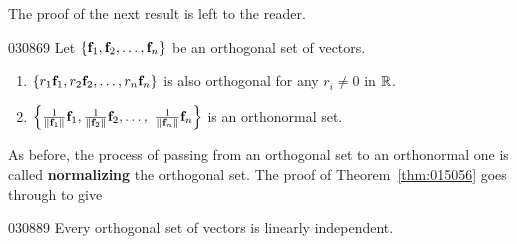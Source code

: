 The proof of the next result is left to the reader.

\begin{theorem}{}{030869}
Let $\{\textbf{f}_{1}, \textbf{f}_{2}, \dots, \textbf{f}_{n}\}$ be an orthogonal set of vectors.

\begin{enumerate}
\item $\{r_{1}\textbf{f}_{1}, r_{2}\textbf{f}_{2}, \dots, r_{n}\textbf{f}_{n}\}$ is also orthogonal for any $r_{i} \neq 0$ in $\mathbb{R}$.

\item $\left\{
\tfrac{1}{\| \textbf{f}_1 \|} \textbf{f}_1, 
\tfrac{1}{\| \textbf{f}_2 \|} \textbf{f}_2, \dots,\
\tfrac{1}{\| \textbf{f}_n \|} \textbf{f}_n
\right\}$ is an orthonormal set.

\end{enumerate}
\end{theorem}

\noindent As before, the process of passing from an orthogonal set to an orthonormal one is called \textbf{normalizing} the orthogonal set. The proof of Theorem~\ref{thm:015056} goes through to give

\begin{theorem}{}{030889}
Every orthogonal set of vectors is linearly independent.
\end{theorem}

